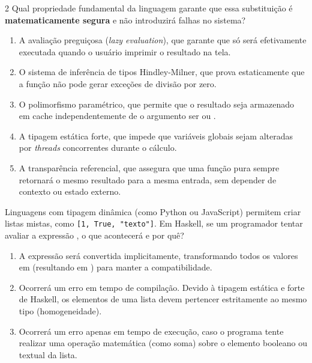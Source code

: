 \documentclass[a4paper,10pt,brazil]{article}
\begin{document}
\begin{multicols}{2}
Qual propriedade fundamental da linguagem garante que essa substituição é \textbf{matematicamente segura} e não introduzirá falhas no sistema?

\begin{enumerate}
  \item A avaliação preguiçosa (\emph{lazy evaluation}), que garante que  só será efetivamente executada quando o usuário imprimir o resultado na tela.

  \item O sistema de inferência de tipos Hindley-Milner, que prova estaticamente que a função não pode gerar exceções de divisão por zero.

  \item O polimorfismo paramétrico, que permite que o resultado seja armazenado em cache independentemente de o argumento ser  ou .

  \item A tipagem estática forte, que impede que variáveis globais sejam alteradas por \textit{threads} concorrentes durante o cálculo.

  \item A transparência referencial, que assegura que uma função pura sempre retornará o mesmo resultado para a mesma entrada, sem depender de contexto ou estado externo.


\end{enumerate}

Linguagens com tipagem dinâmica (como Python ou JavaScript) permitem criar listas mistas, como \texttt{[1, True, "texto"]}. Em Haskell, se um programador tentar avaliar a expressão , o que acontecerá e por quê?

\begin{enumerate}
  \item A expressão será convertida implicitamente, transformando todos os valores em  (resultando em ) para manter a compatibilidade.

  \item Ocorrerá um erro em tempo de compilação. Devido à tipagem estática e forte de Haskell, os elementos de uma lista devem pertencer estritamente ao mesmo tipo (homogeneidade).

  \item Ocorrerá um erro apenas em tempo de execução, caso o programa tente realizar uma operação matemática (como soma) sobre o elemento booleano ou textual da lista.


\end{enumerate}
\end{multicols}
\end{document}
